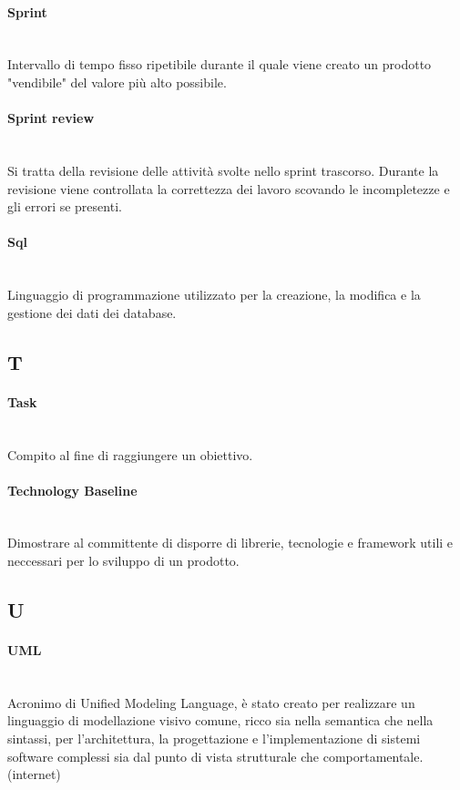 \paragraph{Sprint}~\smallskip \\
Intervallo di tempo fisso ripetibile durante il quale viene creato un prodotto "vendibile" del valore più alto possibile.

\paragraph{Sprint review}~\smallskip \\
Si tratta della revisione delle attività svolte nello sprint trascorso. Durante la revisione viene controllata la correttezza
dei lavoro scovando le incompletezze e gli errori se presenti.

\paragraph{Sql}~\smallskip \\
Linguaggio di programmazione utilizzato per la creazione, la modifica e la gestione dei dati dei database.
\newpage
{}
\subsection*{T}
\paragraph{Task}~\smallskip \\
Compito al fine di raggiungere un obiettivo.

\paragraph{Technology Baseline}~\smallskip \\
Dimostrare al committente di disporre di librerie, tecnologie e framework utili e neccessari per lo sviluppo di un prodotto.

\newpage
{}
\subsection*{U}
\paragraph{UML}~\smallskip \\
Acronimo di Unified Modeling Language, è stato creato per realizzare un linguaggio di modellazione visivo comune, ricco 
sia nella semantica che nella sintassi, per l'architettura, la progettazione e l'implementazione di sistemi 
software complessi sia dal punto di vista strutturale che comportamentale. (internet)

